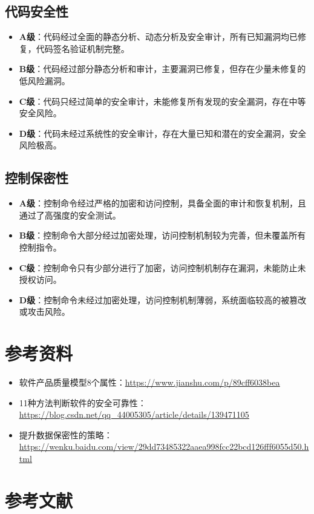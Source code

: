 \subsection{代码安全性}

\begin{itemize}
    \item \textbf{A级}：代码经过全面的静态分析、动态分析及安全审计，所有已知漏洞均已修复，代码签名验证机制完整。
    \item \textbf{B级}：代码经过部分静态分析和审计，主要漏洞已修复，但存在少量未修复的低风险漏洞。
    \item \textbf{C级}：代码只经过简单的安全审计，未能修复所有发现的安全漏洞，存在中等安全风险。
    \item \textbf{D级}：代码未经过系统性的安全审计，存在大量已知和潜在的安全漏洞，安全风险极高。
\end{itemize}

\subsection{控制保密性}

\begin{itemize}
    \item \textbf{A级}：控制命令经过严格的加密和访问控制，具备全面的审计和恢复机制，且通过了高强度的安全测试。
    \item \textbf{B级}：控制命令大部分经过加密处理，访问控制机制较为完善，但未覆盖所有控制指令。
    \item \textbf{C级}：控制命令只有少部分进行了加密，访问控制机制存在漏洞，未能防止未授权访问。
    \item \textbf{D级}：控制命令未经过加密处理，访问控制机制薄弱，系统面临较高的被篡改或攻击风险。
\end{itemize}

\section{参考资料}

\begin{itemize}
  \item 软件产品质量模型8个属性：\href{https://www.jianshu.com/p/89cff6038bea}{\underline{https://www.jianshu.com/p/89cff6038bea}}
  \item 11种方法判断软件的安全可靠性​：\href{https://blog.csdn.net/qq_44005305/article/details/139471105}{\underline{https://blog.csdn.net/qq\_44005305/article/details/139471105}}
  \item 提升数据保密性的策略：\href{https://wenku.baidu.com/view/29dd73485322aaea998fcc22bcd126fff6055d50.html}{\underline{https://wenku.baidu.com/view/29dd73485322aaea998fcc22bcd126fff6055d50.html}}
\end{itemize}

\section*{参考文献}

\printbibliography

